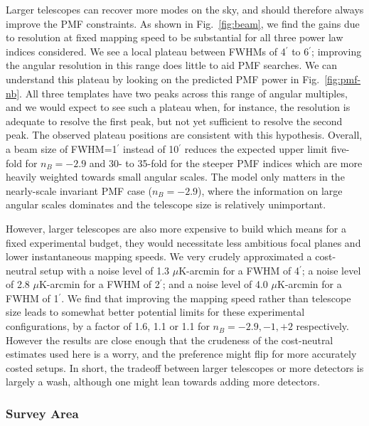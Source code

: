 \documentclass[apj]{emulateapj}
\newcommand{\ukarcmin}{\ensuremath{\mu}{\rm K-arcmin}}
\begin{document}
Larger telescopes can recover more modes on the sky, and should therefore always improve the PMF constraints. 
As shown in Fig.~\ref{fig:beam}, we find the gains due to resolution at fixed mapping speed to be substantial for all three power law indices considered. 
We see a local plateau between FWHMs of 4$^\prime$ to 6$^\prime$; improving the angular resolution in this range does little to aid PMF searches. 
We can understand this plateau by looking on the predicted PMF power in Fig.~\ref{fig:pmf-nb}. 
All three templates have two peaks across this range of angular multiples, and we would expect to see such a plateau when, for instance, the resolution is adequate to resolve the first peak, but not yet sufficient to resolve the second peak. 
The observed plateau positions are consistent with this hypothesis. 
 Overall, a beam size of FWHM=1$^\prime$ instead of 10$^\prime$ reduces the expected upper limit five-fold for $n_B=-2.9$ and 30- to 35-fold for the steeper PMF indices which are more heavily weighted towards small angular scales. 
   The model only matters in the nearly-scale invariant PMF case ($n_B=-2.9$), where the information on large angular scales dominates and the telescope size is relatively unimportant. 


However, larger telescopes are also more expensive to build which means for a fixed experimental budget, they would necessitate less ambitious focal planes and lower instantaneous mapping speeds. 
We very crudely approximated a cost-neutral setup with a noise level of 1.3 \ukarcmin{} for a FWHM of 4$^\prime$; a noise level of 2.8 \ukarcmin{} for a FWHM of 2$^\prime$; and a noise level of 4.0 \ukarcmin{} for a FWHM of 1$^\prime$. 
We find that 
improving the mapping speed rather than telescope size leads to somewhat better potential limits for these experimental configurations, by a factor of 1.6, 1.1 or 1.1 for $n_B = -2.9, -1, +2$ respectively. 
However the results are close enough that the crudeness of the cost-neutral estimates used here is a worry, and the preference might flip for more accurately costed setups. 
In short,  the tradeoff between larger telescopes or more detectors is largely a wash, although one might lean towards adding more detectors. 

\subsubsection{Survey Area}
\end{document}
